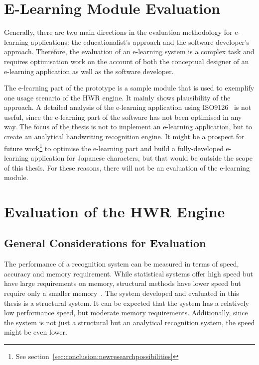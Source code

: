 \section{E-Learning Module Evaluation}
\label{sec:eval:elearning}
Generally, there are two main directions in the evaluation methodology
for e-learning applications: the educationalist's approach and the 
software developer's approach.
Therefore, the evaluation of an e-learning system is a complex task
and requires optimisation work on the account of both the conceptual
designer of an e-learning application as well as the software developer.

The e-learning part of the prototype is a sample module that is used 
to exemplify one usage scenario of the HWR engine. 
It mainly shows plausibility of the approach. A detailed analysis of the
e-learning application using ISO9126~ is not useful,
since the e-learning part of the software has not been optimised in any way.
The focus of the thesis is not to implement an e-learning application,
but to create an analytical handwriting recognition engine.
It might be a prospect for future 
work\footnote{See section~\ref{sec:conclusion:newresearchpossibilities}}
to optimise the e-learning part and build a fully-developed e-learning
application for Japanese characters, but that would be outside the scope of 
this thesis. For these reasons, there will not be an evaluation of the
e-learning module.

\section{Evaluation of the HWR Engine}
\label{sec:eval:hwreval}

\subsection{General Considerations for Evaluation}
\label{sec:eval:generalconsiderations}

The performance of a recognition system can be measured in terms of speed,
accuracy and memory requirement.
While statistical systems offer high speed but have large requirements on memory,
structural methods have lower speed but require only a smaller 
memory~.
The system developed and evaluated in this thesis is a structural system.
It can be expected that the system has a relatively low performance speed,
but moderate memory requirements. 
Additionally, since the system is not just a structural but an analytical
recognition system, the speed might be even lower.

